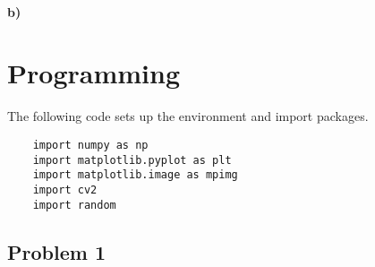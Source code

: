 \documentclass{article}
\begin{document}
\paragraph{b)}


\newpage
\section{Programming}
The following code sets up the environment and import packages.
\begin{lstlisting}
	import numpy as np
	import matplotlib.pyplot as plt
	import matplotlib.image as mpimg
	import cv2
	import random
\end{lstlisting}

\subsection*{Problem 1}
%
%
\end{document}
